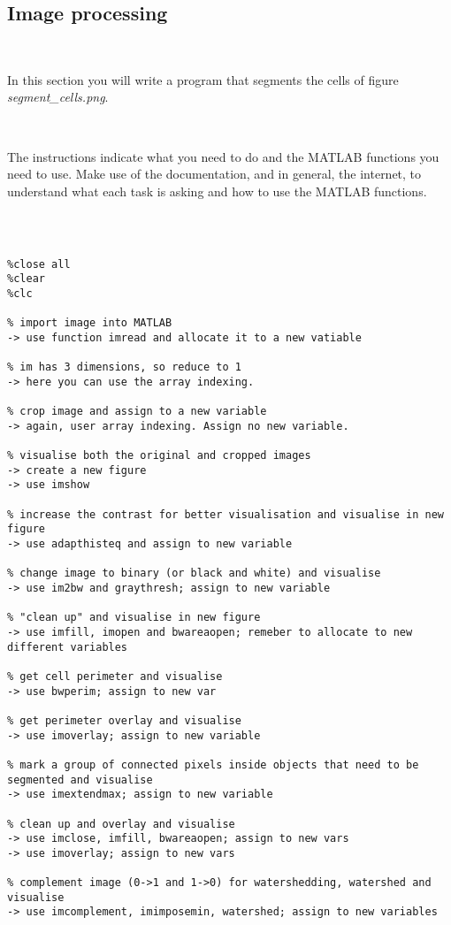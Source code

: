 \documentclass[11pt]{amsart}
\begin{document}




\subsection{Image processing}

\

In this section you will write a program that segments the cells of figure {\it segment\_cells.png}. 

\

The instructions indicate what you need to do and the MATLAB functions you need to use. Make use of the documentation, and in general, the internet, to understand what each task is asking and how to use the MATLAB functions.

\

\color{blue}
\begin{verbatim}

%close all
%clear
%clc

% import image into MATLAB
-> use function imread and allocate it to a new vatiable

% im has 3 dimensions, so reduce to 1
-> here you can use the array indexing.

% crop image and assign to a new variable
-> again, user array indexing. Assign no new variable.

% visualise both the original and cropped images
-> create a new figure
-> use imshow

% increase the contrast for better visualisation and visualise in new figure
-> use adapthisteq and assign to new variable

% change image to binary (or black and white) and visualise
-> use im2bw and graythresh; assign to new variable

% "clean up" and visualise in new figure
-> use imfill, imopen and bwareaopen; remeber to allocate to new different variables

% get cell perimeter and visualise
-> use bwperim; assign to new var

% get perimeter overlay and visualise
-> use imoverlay; assign to new variable

% mark a group of connected pixels inside objects that need to be segmented and visualise
-> use imextendmax; assign to new variable

% clean up and overlay and visualise
-> use imclose, imfill, bwareaopen; assign to new vars
-> use imoverlay; assign to new vars

% complement image (0->1 and 1->0) for watershedding, watershed and visualise
-> use imcomplement, imimposemin, watershed; assign to new variables
\end{verbatim}
\color{black}
\end{document}
